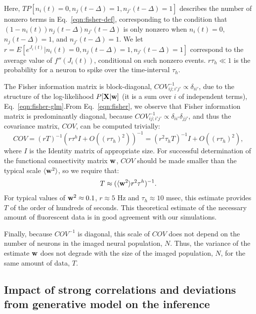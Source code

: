 Here, $TP[n_i(t)=0, n_j(t-\Delta)=1, n_{j'}(t-\Delta)=1]$ describes the number of nonzero
terms in Eq.~\eqref{eqn:fisher-def}, corresponding to the condition that
$(1-n_i(t))n_{j}(t-\Delta)n_{j'}(t-\Delta)$ is only nonzero when 
$n_i(t)=0$, $n_j(t-\Delta)=1$, and $n_{j'}(t-\Delta)=1$.  We let $r=E[e^{J_i(t)}|n_i(t)=0, n_j(t-\Delta)=1, n_{j'}(t-\Delta)=1]$  correspond to the average value of $f''(J_i(t))$, conditional on such nonzero events.  $r\tau_h \ll 1$ is the probability for a neuron to spike over the time-interval $\tau_h$.

The Fisher information matrix is block-diagonal, $COV^{-1}_{ij;i'j'} \propto \delta_{ii'}$, due to the structure of the log-likelihood $P[{\bf X} | \mathbf{w}]$ (it is a sum over $i$ of independent terms), Eq.~\eqref{eqn:fisher-glm}.From Eq.~\eqref{eqn:fisher}, we observe that Fisher information matrix is predominantly diagonal, because $COV^{-1}_{ij;i'j'} \propto \delta_{ii'}\delta_{jj'}$, and thus the covariance matrix, $COV$, can be computed trivially:
\begin{equation}
COV = (rT)^{-1} (r \tau^h I + O((r \tau_h)^2))^{-1} = (r^2 \tau_h T)^{-1} I + O((r \tau_h)^2),
\end{equation}
\noindent where $I$ is the Identity matrix of appropriate size.  For successful determination of the functional connectivity matrix $\mathbf{w}$, $COV$ should be made smaller than the typical scale $\langle \mathbf{w}^2\rangle$, so we require that:
\begin{equation}
T \approx (\langle \bw^2 \rangle r^2  \tau^h)^{-1}.
\end{equation}
For typical values of $\mathbf{w}^2\approx 0.1$, $r\approx 5$ Hz and $ \tau_h \approx 10$ msec, this estimate provides $T$ of the order of hundreds of seconds. This theoretical estimate of the necessary amount of fluorescent data is in good agreement with our simulations.

Finally, because $COV^{-1}$ is diagonal, this scale of $COV$ does not depend on the number of neurons in the imaged neural population, $N$. Thus, the variance of the estimate $\mathbf{w}$ does not degrade with the size of the imaged population, $N$, for the same amount of data, $T$.

\subsection{Impact of strong correlations and deviations from generative model on the inference}


